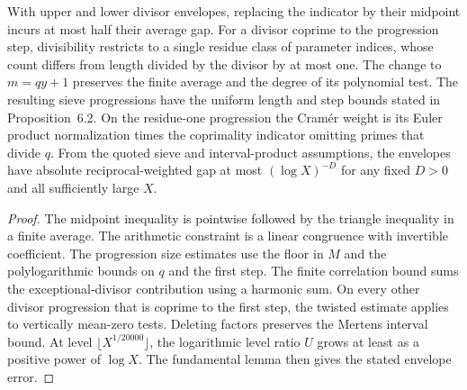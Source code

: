 \begin{lemma}\label{checked-sieve}
\leanok
With upper and lower divisor envelopes, replacing the indicator by
their midpoint incurs at most half their average gap. For a
divisor coprime to the progression step, divisibility restricts to a
single residue class of parameter indices, whose count differs from
length divided by the divisor by at most one. The change to
$m=qy+1$ preserves the finite average and the degree of its
polynomial test. The resulting sieve progressions have the
uniform length and step bounds stated in Proposition~6.2. On the
residue-one progression the Cram\'er weight is its Euler product
normalization times the coprimality indicator omitting primes that
divide $q$. From the quoted sieve and interval-product assumptions,
the envelopes have absolute reciprocal-weighted gap at most
$(\log X)^{-D}$ for any fixed $D>0$ and all sufficiently large $X$.
\end{lemma}
\begin{proof}
\leanok
The midpoint inequality is pointwise followed by the triangle
inequality in a finite average. The arithmetic constraint is a
linear congruence with invertible coefficient.
The progression size estimates use the floor in $M$ and the
polylogarithmic bounds on $q$ and the first step. The finite
correlation bound sums the exceptional-divisor contribution using a
harmonic sum. On every other divisor progression that is coprime
to the first step, the twisted estimate applies to vertically
mean-zero tests. Deleting factors preserves the Mertens interval
bound. At level $\lfloor X^{1/20000}\rfloor$, the logarithmic
level ratio $U$ grows at least as a positive power of $\log X$.
The fundamental lemma then gives the stated envelope error.
\end{proof}

